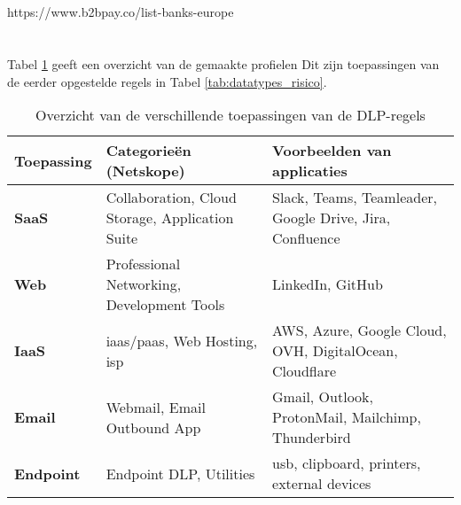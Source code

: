 \subsubsection{}
\label{subsubsec:identificatiegerichte-regels}

\subsubsection{}
\label{subsubsec:gevoelige-persoonsgegevens}



\subsection{}
\label{subsubsec:betalingsgegevens}


https://www.b2bpay.co/list-banks-europe



\section{}
\label{subsubsec:toepassingen}

Tabel \ref{tab:toepassingen} geeft een overzicht van de gemaakte profielen 
Dit zijn toepassingen van de eerder opgestelde regels in Tabel \ref{tab:datatypes_risico}.


\begin{table}[h]
    \centering
    \small
    \begin{tabular}{p{3cm}p{5cm}p{6cm}}
        \toprule
        \textbf{Toepassing} & \textbf{Categorieën (Netskope)} & \textbf{Voorbeelden van applicaties} \\
        \midrule
        \textbf{SaaS}     & Collaboration, Cloud Storage, Application Suite & Slack, Teams, Teamleader, Google Drive, Jira, Confluence \\
        \textbf{Web}      & Professional Networking, Development Tools & LinkedIn, GitHub \\
        \textbf{IaaS}     & \gls{iaas}/\gls{paas}, Web Hosting, \gls{isp} & AWS, Azure, Google Cloud, OVH, DigitalOcean, Cloudflare \\
        \textbf{Email}    & Webmail, Email Outbound App & Gmail, Outlook, ProtonMail, Mailchimp, Thunderbird \\
        \textbf{Endpoint} & Endpoint DLP, Utilities & \gls{usb}, clipboard, printers, external devices \\
        \bottomrule
    \end{tabular}
    \caption{Overzicht van de verschillende toepassingen van de DLP-regels}
    \label{tab:toepassingen}
\end{table}



